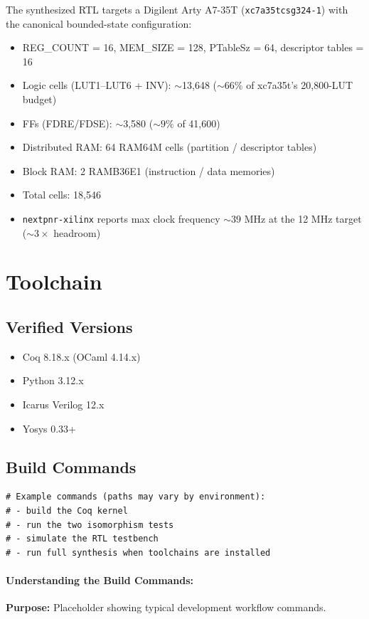 The synthesized RTL targets a Digilent Arty A7-35T (\texttt{xc7a35tcsg324-1})
with the canonical bounded-state configuration:
\begin{itemize}
    \item REG\_COUNT = 16, MEM\_SIZE = 128, PTableSz = 64, descriptor tables = 16
    \item Logic cells (LUT1--LUT6 + INV): $\sim$13{,}648 ($\sim 66\%$ of
          xc7a35t's 20{,}800-LUT budget)
    \item FFs (FDRE/FDSE): $\sim$3{,}580 ($\sim 9\%$ of 41{,}600)
    \item Distributed RAM: 64 RAM64M cells (partition / descriptor tables)
    \item Block RAM: 2 RAMB36E1 (instruction / data memories)
    \item Total cells: 18{,}546
    \item \texttt{nextpnr-xilinx} reports max clock frequency $\sim 39$ MHz
          at the 12 MHz target ($\sim 3\times$ headroom)
\end{itemize}

\section{Toolchain}

\subsection{Verified Versions}

\begin{itemize}
    \item Coq 8.18.x (OCaml 4.14.x)
    \item Python 3.12.x
    \item Icarus Verilog 12.x
    \item Yosys 0.33+
\end{itemize}

\subsection{Build Commands}

\begin{lstlisting}
# Example commands (paths may vary by environment):
# - build the Coq kernel
# - run the two isomorphism tests
# - simulate the RTL testbench
# - run full synthesis when toolchains are installed
\end{lstlisting}

\paragraph{Understanding the Build Commands:}
\textbf{Purpose:} Placeholder showing typical development workflow commands.

